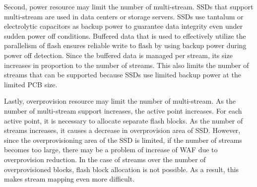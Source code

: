 Second, power resource may limit the number of multi-stream.
SSDs that support multi-stream are used in data centers or storage servers. SSDs use tantalum or electrolytic capacitors as backup power to guarantee data integrity even under sudden power off conditions.
Buffered data that is used to effectively utilize the parallelism of flash ensures reliable write to flash by using backup power during power off detection.
Since the buffered data is managed per stream, its size increases in proportion to the number of streams.
This also limits the number of streams that can be supported because SSDs use limited backup power at the limited PCB size.

Lastly, overprovision resource may limit the number of multi-stream.
As the number of multi-stream support increases, the active point increases. 
For each active point, it is necessary to allocate separate flash blocks.
 As the number of streams increases, it causes a decrease in overprovision area of SSD.
However, since the overprovisioning area of the SSD is limited, if the number of streams becomes too large, there may be a problem of increase of WAF due to overprovision reduction. 
In the case of streams over the number of overprovisioned blocks, flash block allocation  is not possible.
As a result, this makes stream mapping even more difficult.

